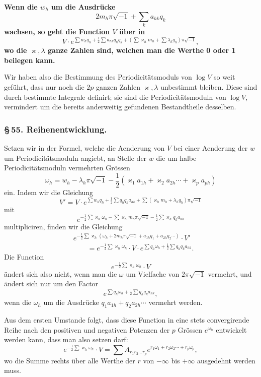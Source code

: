\documentclass[10pt]{article}
\begin{document}
\textbf{Wenn die \(w_h\) um die Ausdrücke}
\[
2m_h\pi\sqrt{-1}+\sum_k a_{hk}q_k
\]
\textbf{wachsen, so geht die Function \(V\) über in}
\[
V\cdot e^{\sum w_hq_h+\frac12\sum a_{hk}q_hq_k+(\sum\varkappa_hm_h+\sum\lambda_hq_h)\pi\sqrt{-1}},
\]
\textbf{wo die \(\varkappa,\lambda\) ganze Zahlen sind, welchen man die Werthe 0 oder 1 beilegen kann.}

Wir haben also die Bestimmung des Periodicitätsmoduls von \(\log V\) so weit geführt, dass nur noch die \(2p\) ganzen Zahlen \(\varkappa,\lambda\) unbestimmt bleiben. Diese sind durch bestimmte Integrale definirt; sie sind die Periodicitätsmoduln von \(\log V\), vermindert um die bereits anderweitig gefundenen Bestandtheile desselben.

\subsubsection*{\S\,55. Reihenentwicklung.}

Setzen wir in der Formel, welche die Aenderung von \(V\) bei einer Aenderung der \(w\) um Periodicitätsmoduln angiebt, an Stelle der \(w\) die um halbe Periodicitätsmoduln vermehrten Grössen
\[
\tag{1}\omega_h=w_h-\lambda_h\pi\sqrt{-1}-\frac12(\varkappa_1a_{1h}+\varkappa_2a_{2h}\cdots+\varkappa_pa_{ph})
\]
ein. Indem wir die Gleichung
\[
V'=V\cdot e^{\sum w_hq_h+\frac12\sum q_hq_ka_{hk}+\sum(\varkappa_hm_h+\lambda_hq_h)\pi\sqrt{-1}}
\]
mit
\[
e^{-\frac12\sum\varkappa_h\omega_h-\sum\varkappa_hm_h\pi\sqrt{-1}-\frac12\sum\varkappa_hq_ka_{hk}}
\]
multipliciren, finden wir die Gleichung
\[
\begin{aligned}
&e^{-\frac12\sum\varkappa_h(\omega_h+2m_h\pi\sqrt{-1}+a_{1h}q_1+a_{2h}q_2\cdots)}\cdot V'\\
&\qquad=e^{-\frac12\sum\varkappa_h\omega_h}\cdot V\cdot e^{\sum q_h\omega_h+\frac12\sum q_hq_ka_{hk}}.
\end{aligned}
\]
Die Function
\[
e^{-\frac12\sum\varkappa_h\omega_h}\cdot V
\]
ändert sich also nicht, wenn man die \(\omega\) um Vielfache von \(2\pi\sqrt{-1}\) vermehrt, und ändert sich nur um den Factor
\[
e^{\sum q_h\omega_h+\frac12\sum q_hq_ka_{hk}},
\]
wenn die \(\omega_h\) um die Ausdrücke \(q_1a_{1h}+q_2a_{2h}\cdots\) vermehrt werden.

Aus dem ersten Umstande folgt, dass diese Function in eine stets convergirende Reihe nach den positiven und negativen Potenzen der \(p\) Grössen \(e^{\omega_h}\) entwickelt werden kann, dass man also setzen darf:
\[
e^{-\frac12\sum\varkappa_h\omega_h}\cdot V=\sum A_{r_1r_2\ldots r_p}e^{r_1\omega_1+r_2\omega_2\cdots+r_p\omega_p},
\]
wo die Summe rechts über alle Werthe der \(r\) von \(-\infty\) bis \(+\infty\) ausgedehnt werden muss.
\end{document}
